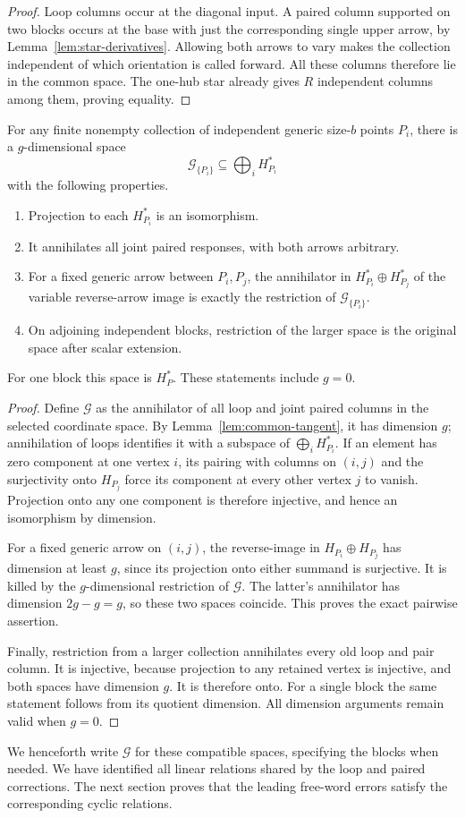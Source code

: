 \begin{proof}
Loop columns occur at the diagonal input. A paired column supported
on two blocks occurs at the base with just the corresponding single
upper arrow, by Lemma~\ref{lem:star-derivatives}. Allowing both
arrows to vary makes the collection independent of which orientation
is called forward. All these columns therefore lie in the common
space. The one-hub star already gives \(R\) independent columns
among them, proving equality.
\end{proof}

\begin{proposition}
\label{prop:compatible-relations}
For any finite nonempty collection of independent generic size-\(b\)
points \(P_i\), there is a \(g\)-dimensional space
\[
 \mathcal G_{\{P_i\}}\subseteq\bigoplus_i H_{P_i}^*
\]
with the following properties.
\begin{enumerate}
\item Projection to each \(H_{P_i}^*\) is an isomorphism.
\item It annihilates all joint paired responses, with both arrows
arbitrary.
\item For a fixed generic arrow between \(P_i,P_j\), the
annihilator in \(H_{P_i}^*\oplus H_{P_j}^*\) of the variable
reverse-arrow image is exactly the restriction of
\(\mathcal G_{\{P_i\}}\).
\item On adjoining independent blocks, restriction of the larger
space is the original space after scalar extension.
\end{enumerate}
For one block this space is \(H_P^*\). These statements include
\(g=0\).
\end{proposition}

\begin{proof}
Define \(\mathcal G\) as the annihilator of all loop and joint
paired columns in the selected coordinate space. By
Lemma~\ref{lem:common-tangent}, it has dimension \(g\); annihilation
of loops identifies it with a subspace of \(\bigoplus_i H_{P_i}^*\).
If an element has zero component at one vertex \(i\), its pairing
with columns on \((i,j)\) and the surjectivity onto \(H_{P_j}\)
force its component at every other vertex \(j\) to vanish.
Projection onto any one component is therefore injective, and hence
an isomorphism by dimension.

For a fixed generic arrow on \((i,j)\), the reverse-image in
\(H_{P_i}\oplus H_{P_j}\) has dimension at least \(g\), since
its projection onto either summand is surjective. It is killed by
the \(g\)-dimensional restriction of \(\mathcal G\). The latter's
annihilator has dimension \(2g-g=g\), so these two spaces coincide.
This proves the exact pairwise assertion.

Finally, restriction from a larger collection annihilates every old
loop and pair column. It is injective, because projection to any
retained vertex is injective, and both spaces have dimension \(g\).
It is therefore onto. For a single block the same statement follows
from its quotient dimension. All dimension arguments remain valid
when \(g=0\).
\end{proof}

We henceforth write \(\mathcal G\) for these compatible spaces,
specifying the blocks when needed. We have identified all linear
relations shared by the loop and paired corrections. The next
section proves that the leading free-word errors satisfy the
corresponding cyclic relations.
